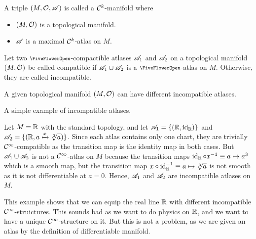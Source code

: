 \begin{definition}[\(\SC^{k}\)-manifold]
	A triple \((M, \mathcal{O}, \mathscr{A})\) is called a \(\SC^{k}\)-manifold where
	\begin{itemize}
		\item \((M, \mathcal{O})\) is a topological manifold.
		\item \(\mathscr{A}\) is a maximal \(\SC^{k}\)-atlas on \(M\).
	\end{itemize}
\end{definition}

\begin{definition}
	Let two \(\flower\)-compactible atlases \(\mathscr{A}_1\) and \(\mathscr{A}_2\) on a topological manifold \((M, \mathcal{O})\) be called compatible if \(\mathscr{A}_1 \cup \mathscr{A}_2\) is a $\flower$-atlas on \(M\). Otherwise, they are called incompatible.
\end{definition}

\begin{remark}
	A given topological manifold \((M, \mathcal{O})\) can have different incompatible atlases.
\end{remark}

A simple example of incompatible atlases,
\begin{example}
	Let \(M = \mathbb R\) with the standard topology, and let \(\mathscr{A}_1 = \{(\mathbb R, \operatorname{id}_{\mathbb R})\}\) and \(\mathscr{A}_2 = \{(\mathbb R, a \xmapsto[]{x} \sqrt[3]{a})\}\). Since each atlas contains only one chart, they are trivially \(\mathcal C^{\infty}\)-compatible as the transition map is the identity map in both cases. But \(\mathscr{A}_1 \cup \mathscr{A}_2\) is not a \(\mathcal C^{\infty}\)-atlas on \(M\) because the transition maps \(\operatorname{id}_{\mathbb R} \circ x^{-1} \equiv a \mapsto a^3\) which is a smooth map, but the transition map \(x \circ \operatorname{id}_{\mathbb R}^{-1} \equiv a \mapsto \sqrt[3]{a}\) is not smooth as it is not differentiable at \(a = 0\). Hence, \(\mathscr{A}_1\) and \(\mathscr{A}_2\) are incompatible atlases on \(M\).
\end{example}

This example shows that we can equip the real line \(\mathbb R\) with different incompatible \(\mathcal C^{\infty}\)-struictures. This sounds bad as we want to do physics on \(\mathbb R\), and we want to have a unique \(\mathcal C^{\infty}\)-structure on it. But this is not a problem, as we are given an atlas by the definition of differentiable manifold.

